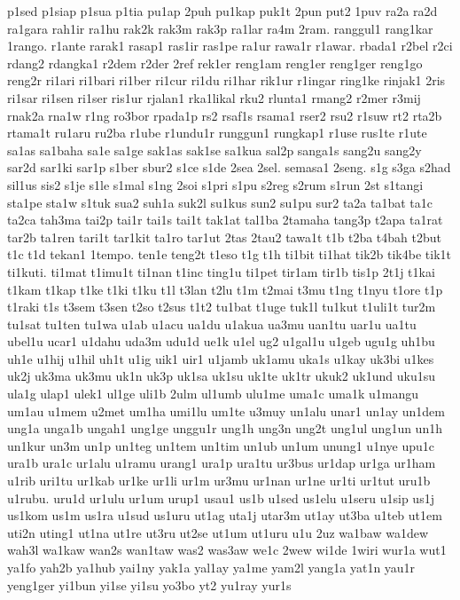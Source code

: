 p1sed
p1siap
p1sua
p1tia
pu1ap
2puh
pu1kap
puk1t
2pun
put2
1puv
ra2a
ra2d
ra1gara
rah1ir
ra1hu
rak2k
rak3m
rak3p
ra1lar
ra4m
2ram.
ranggul1
rang1kar
1rango.
r1ante
rarak1
rasap1
ras1ir
ras1pe
ra1ur
rawa1r
r1awar.
rbada1
r2bel
r2ci
rdang2
rdangka1
r2dem
r2der
2ref
rek1er
reng1am
reng1er
reng1ger
reng1go
reng2r
ri1ari
ri1bari
ri1ber
ri1cur
ri1du
ri1har
rik1ur
r1ingar
ring1ke
rinjak1
2ris
ri1sar
ri1sen
ri1ser
ris1ur
rjalan1
rka1likal
rku2
rlunta1
rmang2
r2mer
r3mij
rnak2a
rna1w
r1ng
ro3bor
rpada1p
rs2
rsaf1s
rsama1
rser2
rsu2
r1suw
rt2
rta2b
rtama1t
ru1aru
ru2ba
r1ube
r1undu1r
runggun1
rungkap1
r1use
rus1te
r1ute
sa1as
sa1baha
sa1e
sa1ge
sak1as
sak1se
sa1kua
sal2p
sanga1s
sang2u
sang2y
sar2d
sar1ki
sar1p
s1ber
sbur2
s1ce
s1de
2sea
2sel.
semasa1
2seng.
s1g
s3ga
s2had
sil1us
sis2
s1je
s1le
s1mal
s1ng
2soi
s1pri
s1pu
s2reg
s2rum
s1run
2st
s1tangi
sta1pe
sta1w
s1tuk
sua2
suh1a
suk2l
su1kus
sun2
su1pu
sur2
ta2a
ta1bat
ta1c
ta2ca
tah3ma
tai2p
tai1r
tai1s
tai1t
tak1at
tal1ba
2tamaha
tang3p
t2apa
ta1rat
tar2b
ta1ren
tari1t
tar1kit
ta1ro
tar1ut
2tas
2tau2
tawa1t
t1b
t2ba
t4bah
t2but
t1c
t1d
tekan1
1tempo.
ten1e
teng2t
t1eso
t1g
t1h
ti1bit
ti1hat
tik2b
tik4be
tik1t
ti1kuti.
ti1mat
t1imu1t
ti1nan
t1inc
ting1u
ti1pet
tir1am
tir1b
tis1p
2t1j
t1kai
t1kam
t1kap
t1ke
t1ki
t1ku
t1l
t3lan
t2lu
t1m
t2mai
t3mu
t1ng
t1nyu
t1ore
t1p
t1raki
t1s
t3sem
t3sen
t2so
t2sus
t1t2
tu1bat
t1uge
tuk1l
tu1kut
t1uli1t
tur2m
tu1sat
tu1ten
tu1wa
u1ab
u1acu
ua1du
u1akua
ua3mu
uan1tu
uar1u
ua1tu
ubel1u
ucar1
u1dahu
uda3m
udu1d
ue1k
u1el
ug2
u1gal1u
u1geb
ugu1g
uh1bu
uh1e
u1hij
u1hil
uh1t
u1ig
uik1
uir1
u1jamb
uk1amu
uka1s
u1kay
uk3bi
u1kes
uk2j
uk3ma
uk3mu
uk1n
uk3p
uk1sa
uk1su
uk1te
uk1tr
ukuk2
uk1und
uku1su
ula1g
ulap1
ulek1
ul1ge
uli1b
2ulm
ul1umb
ulu1me
uma1c
uma1k
u1mangu
um1au
u1mem
u2met
um1ha
umi1lu
um1te
u3muy
un1alu
unar1
un1ay
un1dem
ung1a
unga1b
ungah1
ung1ge
unggu1r
ung1h
ung3n
ung2t
ung1ul
ung1un
un1h
un1kur
un3m
un1p
un1teg
un1tem
un1tim
un1ub
un1um
unung1
u1nye
upu1c
ura1b
ura1c
ur1alu
u1ramu
urang1
ura1p
ura1tu
ur3bus
ur1dap
ur1ga
ur1ham
u1rib
uri1tu
ur1kab
ur1ke
ur1li
ur1m
ur3mu
ur1nan
ur1ne
ur1ti
ur1tut
uru1b
u1rubu.
uru1d
ur1ulu
ur1um
urup1
usau1
us1b
u1sed
us1elu
u1seru
u1sip
us1j
us1kom
us1m
us1ra
u1sud
us1uru
ut1ag
uta1j
utar3m
ut1ay
ut3ba
u1teb
ut1em
uti2n
uting1
ut1na
ut1re
ut3ru
ut2se
ut1um
ut1uru
u1u
2uz
wa1baw
wa1dew
wah3l
wa1kaw
wan2s
wan1taw
was2
was3aw
we1c
2wew
wi1de
1wiri
wur1a
wut1
ya1fo
yah2b
ya1hub
yai1ny
yak1a
yal1ay
ya1me
yam2l
yang1a
yat1n
yau1r
yeng1ger
yi1bun
yi1se
yi1su
yo3bo
yt2
yu1ray
yur1s
